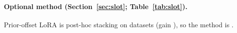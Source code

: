 \paragraph{Optional method (Section~\ref{sec:slot}; Table~\ref{tab:slot}).}\label{sec:exp-slot}
Prior-offset LoRA is  post-hoc stacking on  datasets (gain
), so the method is .
